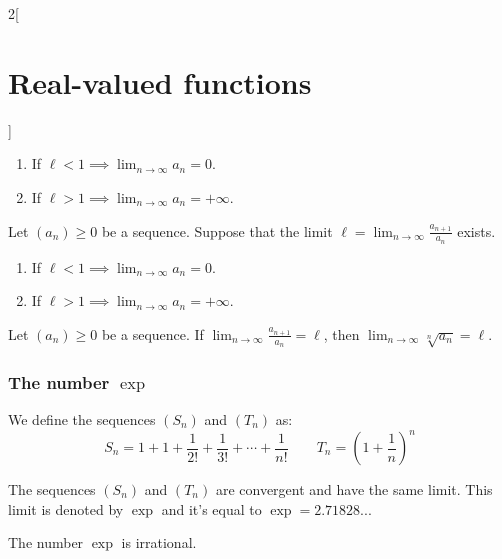 \documentclass[../../../main_math.tex]{subfiles}
\begin{document}
\begin{multicols}{2}[\section{Real-valued functions}]
\begin{theorem}
\begin{enumerate}
      \item If $\displaystyle \ell<1\implies\lim_{n\to\infty}a_n=0$.
      \item If $\displaystyle \ell>1\implies\lim_{n\to\infty}a_n=+\infty$.
    \end{enumerate}
  \end{theorem}
  \begin{theorem}
    Let $(a_n)\geq 0$ be a sequence. Suppose that the limit $\displaystyle \ell=\lim_{n\to\infty}\frac{a_{n+1}}{a_n}$ exists.
    \begin{enumerate}
      \item If $\displaystyle \ell<1\implies\lim_{n\to\infty}a_n=0$.
      \item If $\displaystyle \ell>1\implies\lim_{n\to\infty}a_n=+\infty$.
    \end{enumerate}
  \end{theorem}
  \begin{theorem}
    Let $(a_n)\geq 0$ be a sequence. If $\displaystyle \lim_{n\to\infty}\frac{a_{n+1}}{a_n}=\ell$, then $\displaystyle \lim_{n\to\infty}\sqrt[n]{a_n}=\ell$.
  \end{theorem}
  \subsubsection{The number $\exp{}$}
  \begin{definition}
    We define the sequences $(S_n)$ and $(T_n)$ as:
    $$S_n=1+1+\frac{1}{2!}+\frac{1}{3!}+\cdots+\frac{1}{n!}\qquad T_n={\left(1+\frac{1}{n}\right)}^n$$
  \end{definition}
  \begin{proposition}
    The sequences $(S_n)$ and $(T_n)$ are convergent and have the same limit. This limit is denoted by $\exp{}$ and it's equal to $\exp{}=2.71828...$
  \end{proposition}
  \begin{theorem}
    The number $\exp{}$ is irrational.
  \end{theorem}

\end{multicols}
\end{document}
